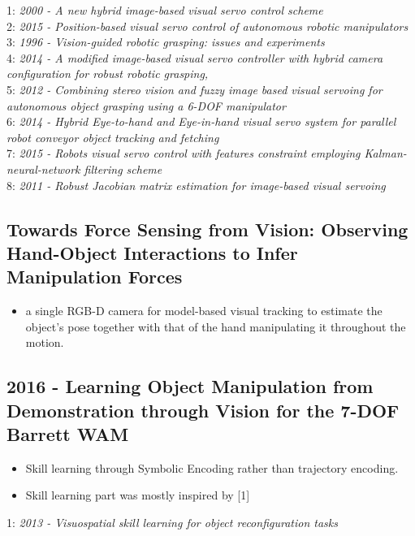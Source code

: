 1: \textit{2000 - A new hybrid image-based visual servo control scheme} \\
2: \textit{2015 - Position-based visual servo control of autonomous robotic manipulators} \\
3: \textit{1996 - Vision-guided robotic grasping: issues and experiments} \\
4: \textit{2014 - A modified image-based visual servo controller with hybrid camera configuration for robust robotic grasping,} \\
5: \textit{2012 - Combining stereo vision and fuzzy image based visual servoing for autonomous object grasping using a 6-DOF manipulator} \\
6: \textit{2014 - Hybrid Eye-to-hand and Eye-in-hand visual servo system for parallel robot conveyor object tracking and fetching} \\
7: \textit{2015 - Robots visual servo control with features constraint employing Kalman-neural-network filtering scheme} \\
8: \textit{2011 - Robust Jacobian matrix estimation for image-based
visual servoing}



\subsection{Towards Force Sensing from Vision: Observing Hand-Object Interactions to Infer Manipulation Forces}
\begin{itemize}
\item a single RGB-D camera for model-based visual
tracking to estimate the object's pose together with that
of the hand manipulating it throughout the motion. 
\end{itemize}

\subsection{2016 - Learning Object Manipulation from Demonstration through Vision for the 7-DOF Barrett WAM}
\begin{itemize}
\item Skill learning through Symbolic Encoding rather than trajectory encoding. 
\item Skill learning part was mostly inspired by [1]
\end{itemize}
1: \textit{2013 - Visuospatial skill learning for object reconfiguration
tasks}


